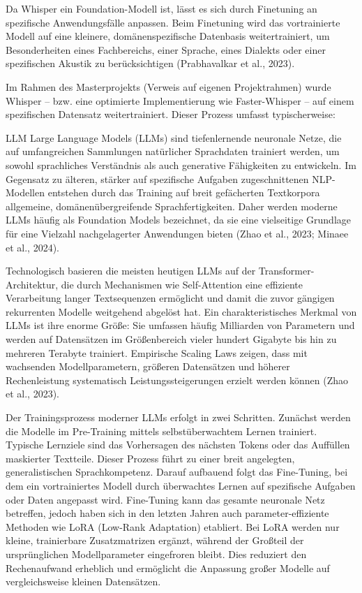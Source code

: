 Da Whisper ein Foundation-Modell ist, lässt es sich durch Finetuning an spezifische Anwendungsfälle anpassen. Beim Finetuning wird das vortrainierte Modell auf eine kleinere, domänenspezifische Datenbasis weitertrainiert, um Besonderheiten eines Fachbereichs, einer Sprache, eines Dialekts oder einer spezifischen Akustik zu berücksichtigen (Prabhavalkar et al., 2023).

Im Rahmen des Masterprojekts (Verweis auf eigenen Projektrahmen) wurde Whisper – bzw. eine optimierte Implementierung wie Faster-Whisper – auf einem spezifischen Datensatz weitertrainiert. Dieser Prozess umfasst typischerweise:

LLM
Large Language Models (LLMs) sind tiefenlernende neuronale Netze, die auf umfangreichen Sammlungen natürlicher Sprachdaten trainiert werden, um sowohl sprachliches Verständnis als auch generative Fähigkeiten zu entwickeln. Im Gegensatz zu älteren, stärker auf spezifische Aufgaben zugeschnittenen NLP-Modellen entstehen durch das Training auf breit gefächerten Textkorpora allgemeine, domänenübergreifende Sprachfertigkeiten. Daher werden moderne LLMs häufig als Foundation Models bezeichnet, da sie eine vielseitige Grundlage für eine Vielzahl nachgelagerter Anwendungen bieten (Zhao et al., 2023; Minaee et al., 2024).

Technologisch basieren die meisten heutigen LLMs auf der Transformer-Architektur, die durch Mechanismen wie Self-Attention eine effiziente Verarbeitung langer Textsequenzen ermöglicht und damit die zuvor gängigen rekurrenten Modelle weitgehend abgelöst hat. Ein charakteristisches Merkmal von LLMs ist ihre enorme Größe: Sie umfassen häufig Milliarden von Parametern und werden auf Datensätzen im Größenbereich vieler hundert Gigabyte bis hin zu mehreren Terabyte trainiert. Empirische Scaling Laws zeigen, dass mit wachsenden Modellparametern, größeren Datensätzen und höherer Rechenleistung systematisch Leistungssteigerungen erzielt werden können (Zhao et al., 2023).

Der Trainingsprozess moderner LLMs erfolgt in zwei Schritten. Zunächst werden die Modelle im Pre-Training mittels selbstüberwachtem Lernen trainiert. Typische Lernziele sind das Vorhersagen des nächsten Tokens oder das Auffüllen maskierter Textteile. Dieser Prozess führt zu einer breit angelegten, generalistischen Sprachkompetenz. Darauf aufbauend folgt das Fine-Tuning, bei dem ein vortrainiertes Modell durch überwachtes Lernen auf spezifische Aufgaben oder Daten angepasst wird. Fine-Tuning kann das gesamte neuronale Netz betreffen, jedoch haben sich in den letzten Jahren auch parameter-effiziente Methoden wie LoRA (Low-Rank Adaptation) etabliert. Bei LoRA werden nur kleine, trainierbare Zusatzmatrizen ergänzt, während der Großteil der ursprünglichen Modellparameter eingefroren bleibt. Dies reduziert den Rechenaufwand erheblich und ermöglicht die Anpassung großer Modelle auf vergleichsweise kleinen Datensätzen.

